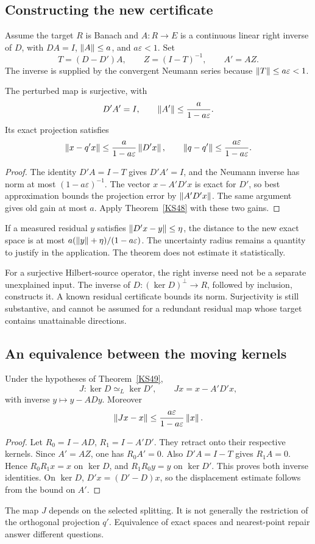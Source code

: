 \subsection{Constructing the new certificate}
Assume the target \(R\) is Banach and \(A:R\to E\) is a continuous linear right inverse of \(D\), with \(DA=I\), \(\left\lVert A\right\rVert\le a\), and \(a\varepsilon<1\). Set
\[
 T=(D-D')A,\qquad Z=(I-T)^{-1},\qquad A'=AZ.
\]
The inverse is supplied by the convergent Neumann series because \(\left\lVert T\right\rVert\le a\varepsilon<1\).

\begin{theorem}\label{KS49}
The perturbed map is surjective, with
\[
 D'A'=I,\qquad \left\lVert A'\right\rVert\le\frac{a}{1-a\varepsilon}.
\]
Its exact projection satisfies
\[
 \left\lVert x-q'x\right\rVert\le\frac{a}{1-a\varepsilon}\left\lVert D'x\right\rVert,\qquad
 \left\lVert q-q'\right\rVert\le\frac{a\varepsilon}{1-a\varepsilon}.
\]
\end{theorem}
\begin{proof}
The identity \(D'A=I-T\) gives \(D'A'=I\), and the Neumann inverse has norm at most \((1-a\varepsilon)^{-1}\). The vector \(x-A'D'x\) is exact for \(D'\), so best approximation bounds the projection error by \(\left\lVert A'D'x\right\rVert\). The same argument gives old gain at most \(a\). Apply Theorem~\ref{KS48} with these two gains.
\end{proof}
If a measured residual \(y\) satisfies \(\left\lVert D'x-y\right\rVert\le\eta\), the distance to the new exact space is at most \(a(\left\lVert y\right\rVert+\eta)/(1-a\varepsilon)\). The uncertainty radius remains a quantity to justify in the application. The theorem does not estimate it statistically.

For a surjective Hilbert-source operator, the right inverse need not be a separate unexplained input. The inverse of \(D:(\ker D)^\perp\to R\), followed by inclusion, constructs it. A known residual certificate bounds its norm. Surjectivity is still substantive, and cannot be assumed for a redundant residual map whose target contains unattainable directions.

\subsection{An equivalence between the moving kernels}
\begin{theorem}\label{KS50}
Under the hypotheses of Theorem~\ref{KS49},
\[
 J:\ker D\simeq_L\ker D',\qquad Jx=x-A'D'x,
\]
with inverse \(y\mapsto y-ADy\). Moreover
\[
 \left\lVert Jx-x\right\rVert\le\frac{a\varepsilon}{1-a\varepsilon}\left\lVert x\right\rVert.
\]
\end{theorem}
\begin{proof}
Let \(R_0=I-AD\), \(R_1=I-A'D'\). They retract onto their respective kernels. Since \(A'=AZ\), one has \(R_0A'=0\). Also \(D'A=I-T\) gives \(R_1A=0\). Hence \(R_0R_1x=x\) on \(\ker D\), and \(R_1R_0y=y\) on \(\ker D'\). This proves both inverse identities. On \(\ker D\), \(D'x=(D'-D)x\), so the displacement estimate follows from the bound on \(A'\).
\end{proof}
The map \(J\) depends on the selected splitting. It is not generally the restriction of the orthogonal projection \(q'\). Equivalence of exact spaces and nearest-point repair answer different questions.

